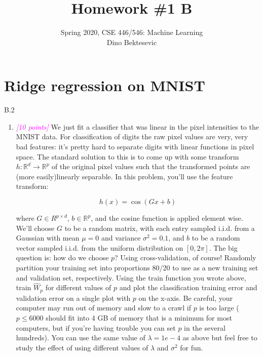 \documentclass{article}
\date{{}}
\newcommand{\field}[1]{\mathbb{#1}}
\newcommand{\1}{\mathbf{1}}
\newcommand{\R}{\field{R}} %
\newcommand{\points}[1]{\small\textcolor{magenta}{\emph{[#1 points]}} \normalsize}
\begin{document}
\title{Homework \#1 B}
\author{\normalsize{Spring 2020, CSE 446/546: Machine Learning}\\
\normalsize{Dino Bektesevic}}
\maketitle

\section*{Ridge regression on MNIST}
B.2 
\begin{enumerate}
    \item \points{10} We just fit a classifier that was linear in the pixel intensities to the MNIST data. For classification of digits the raw pixel values are very, very bad features: it’s pretty hard to separate digits with linear functions in pixel space. The standard solution to this is to come up with some transform $h:\R^d\rightarrow \R^p$ of the original pixel values such that the transformed points are (more easily)linearly separable. In this problem, you’ll use the feature transform:
    
    $$h(x) = \cos(Gx+b)$$
    
    where $G\in R^{p\times d}$, $b\in \R^p$, and the cosine function is applied element wise. We’ll choose $G$ to be a random matrix, with each entry sampled i.i.d. from a Gaussian with mean $\mu = 0$ and variance $\sigma^2=0.1$, and $b$ to be a random vector sampled i.i.d. from the uniform distribution on $[0, 2\pi]$. The big question is: how do we choose $p$? Using cross-validation, of course! Randomly partition your training set into proportions 80/20 to use as a new training set and validation set, respectively. Using the train function you wrote above, train $\widehat W_p$ for different values of $p$ and plot the classification training error and validation error on a single plot with $p$ on the x-axis. Be careful, your computer may run out of memory and slow to a crawl if $p$ is too large ($p\leq 6000$ should fit into 4 GB of memory that is a minimum for most computers, but if you’re having trouble you can set $p$ in the several hundreds). You can use the same value of $\lambda = 1e-4$ as above but feel free to study the effect of using different values of $\lambda$ and $\sigma^2$ for fun.
    

\end{enumerate}
\end{document}
